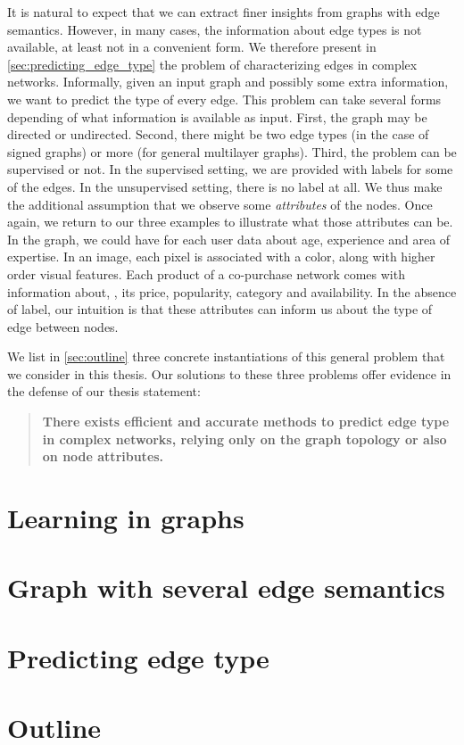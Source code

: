 It is natural to expect that we can extract finer insights from graphs with edge semantics. However,
in many cases, the information about edge types is not available, at least not in a convenient form.
We therefore present in
\autoref{sec:predicting_edge_type} the problem of characterizing edges in complex networks.
Informally, given an input graph and possibly some extra information, we want to predict the type of
every edge. This problem can take several forms depending of what information is available as input.
First, the graph may be directed or undirected. Second, there might be two edge types (in the case of
signed graphs) or more (for general multilayer graphs). Third, the problem can be supervised or not.
In the supervised setting, we are provided with labels for some of the edges. In the unsupervised
setting, there is no label at all. We thus make the additional assumption that we observe some
\emph{attributes} of the nodes. Once again, we return to our three examples to illustrate what
those attributes can be. In the \wik{} graph, we could have for each user data about age, experience and
area of expertise. In an image, each pixel is associated with a color, along with higher order
visual features. Each product of a co-purchase network comes with information about, \eg{}, its price,
popularity, category and availability. In the absence of label, our intuition is that these
attributes can inform us about the type of edge between nodes. 

\medskip

We list in \autoref{sec:outline} three concrete instantiations of this general problem that we
consider in this thesis. Our solutions to these three problems offer evidence in the defense of our
thesis statement:
\begin{quote}
\bf
There exists efficient and accurate methods to predict edge type in complex networks, relying
only on the graph topology or also on node attributes.
\end{quote}

\section{Learning in graphs}
\label{sec:learning_in_graphs}


\section{Graph with several edge semantics}
\label{sec:edge_semantics}


\section{Predicting edge type}
\label{sec:predicting_edge_type}


\section{Outline}
\label{sec:outline}


